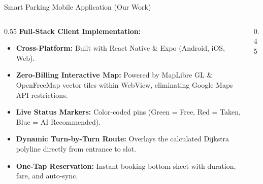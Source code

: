\documentclass[aspectratio=169]{beamer}
\begin{document}
\begin{frame}{Smart Parking Mobile Application (Our Work)}
    \begin{columns}
        \begin{column}{0.55\textwidth}
            \textbf{Full-Stack Client Implementation:}
            \begin{itemize}
                \item \textbf{Cross-Platform:} Built with React Native \& Expo (Android, iOS, Web).
                \item \textbf{Zero-Billing Interactive Map:} Powered by MapLibre GL \& OpenFreeMap vector tiles within WebView, eliminating Google Maps API restrictions.
                \item \textbf{Live Status Markers:} Color-coded pins (Green = Free, Red = Taken, Blue = AI Recommended).
                \item \textbf{Dynamic Turn-by-Turn Route:} Overlays the calculated Dijkstra polyline directly from entrance to slot.
                \item \textbf{One-Tap Reservation:} Instant booking bottom sheet with duration, fare, and auto-sync.
            \end{itemize}
        \end{column}
        \begin{column}{0.45\textwidth}
            \begin{center}
            \end{center}
        \end{column}
    \end{columns}
\end{frame}
\end{document}
